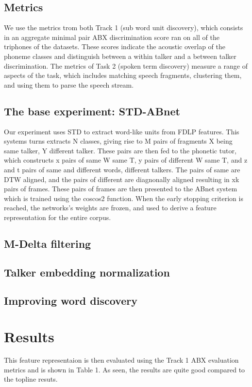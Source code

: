 \documentclass[a4paper]{article}
\begin{document}
\subsection{Metrics}
We use the metrics trom both Track 1 (sub word unit discovery), which consists in an aggregate minimal pair ABX discrimination score ran on all of the triphones of the datasets. These scores indicate the acoustic overlap of the phoneme classes and distinguish between a within talker and a between talker discrimination. The metrics of Task 2 (spoken term discovery) measure a range of aspects of the task, which includes matching speech fragments, clustering them, and using them to parse the speech stream.
\subsection{The base experiment: STD-ABnet}
Our experiment uses STD to extract word-like units from FDLP features. This systems turns extracts N classes, giving rise to M pairs of fragments X being same talker, Y different talker. These pairs are then fed to the phonetic tutor, which constructs x pairs of same W same T, y pairs of different W same T, and z and t pairs of same and different words, different talkers. The pairs of same are DTW aligned, and the pairs of different are diagnonally aligned resulting in xk pairs of frames.
These pairs of frames are then presented to the ABnet system which is trained using the coscos2 function. When the early stopping criterion is reached, the networks's weights are frozen, and used to derive a feature representation for the entire corpus.
\subsection{M-Delta filtering}
\subsection{Talker embedding normalization}
\subsection{Improving word discovery}

\section{Results}
This feature representaion is then evaluated using the Track 1 ABX evaluation metrics and is shown in Table 1.
As seen, the results are quite good compared to the topline resuts.
\end{document}

